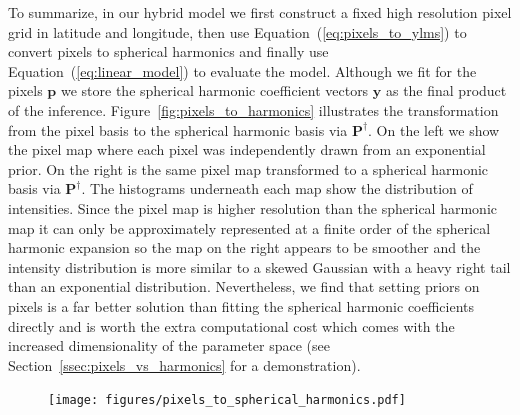 \documentclass[modern]{aastex62}
\begin{document}
To summarize, in our hybrid model we first construct a fixed high resolution pixel grid in latitude and longitude, then use Equation~(\ref{eq:pixels_to_ylms}) to convert pixels to spherical harmonics and finally use Equation~(\ref{eq:linear_model}) to evaluate the model.
Although we fit for the pixels $\mathbf{p}$ we store the spherical harmonic coefficient vectors $\mathbf{y}$ as the final product of the inference. 
Figure~\ref{fig:pixels_to_harmonics} illustrates the transformation from the pixel basis to the spherical harmonic basis via $\mathbf{P}^\dagger$.
On the left we show the pixel map where each pixel was independently drawn from an exponential prior. 
On the right is the same pixel map transformed to a spherical harmonic basis via $\mathbf{P}^\dagger$. 
The histograms underneath each map show the distribution of intensities.
Since the pixel map is higher resolution than the spherical harmonic map it can only be approximately represented at a finite order of the spherical harmonic expansion so the map on the right appears to be smoother and the intensity distribution is more similar to a skewed Gaussian with a heavy right tail than an exponential distribution.
Nevertheless, we find that setting priors on pixels is a far better solution than fitting the spherical harmonic coefficients directly and is worth the extra computational cost which comes with the increased dimensionality of the parameter space (see Section~\ref{ssec:pixels_vs_harmonics} for a demonstration).

\begin{figure}[t!]
    \begin{centering}
    \texttt{[image: figures/pixels\_to\_spherical\_harmonics.pdf]}
    \end{centering}
\end{figure}
\end{document}

